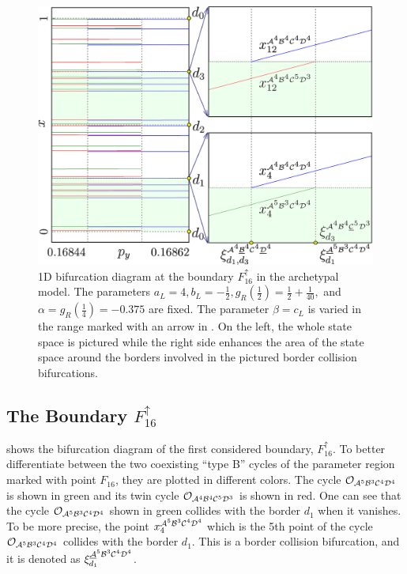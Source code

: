 \begin{figure}
	\centering
	\includegraphics[width=.7 \textwidth]{../Figures/6/6.6/result.png}
	\caption[1D bifurcation diagram at the boundary $F_{16}^\uparrow$ in the archetypal model]{
		1D bifurcation diagram at the boundary $F_{16}^\uparrow$ in the archetypal model.
		The parameters $a_L = 4, b_L = -\frac{1}{2}, g_R\left(\frac{1}{2}\right) = \frac{1}{2} + \frac{1}{40},$ and $\alpha = g_R\left(\frac{1}{4}\right) = -0.375$ are fixed.
		The parameter $\beta = c_L$ is varied in the range marked with an arrow in .
		On the left, the whole state space is pictured while the right side enhances the area of the state space around the borders involved in the pictured border collision bifurcations.
	}
	\label{fig:arch.bif.F.up}
\end{figure}

\clearpage
\subsection{The Boundary $F_{16}^\uparrow$}
\label{sec:arch.bif.U}

 shows the bifurcation diagram of the first considered boundary, $F_{16}^\uparrow$.
To better differentiate between the two coexisting ``type B'' cycles of the parameter region marked with point $F_{16}$, they are plotted in different colors.
The cycle $\mathcal{O}_{\mathcal{A}^5\mathcal{B}^3\mathcal{C}^4\mathcal{D}^4}$ is shown in green and its twin cycle $\mathcal{O}_{\mathcal{A}^4\mathcal{B}^4\mathcal{C}^5\mathcal{D}^3}$ is shown in  red.
One can see that the cycle $\mathcal{O}_{\mathcal{A}^5\mathcal{B}^3\mathcal{C}^4\mathcal{D}^4}$ shown in green collides with the border $d_1$ when it vanishes.
To be more precise, the point $x_4^{\mathcal{A}^5\mathcal{B}^3\mathcal{C}^4\mathcal{D}^4}$ which is the 5th point of the cycle $\mathcal{O}_{\mathcal{A}^5\mathcal{B}^3\mathcal{C}^4\mathcal{D}^4}$ collides with the border $d_1$.
This is a border collision bifurcation, and it is denoted as $\xi_{d_1}^{\underline{\mathcal{A}}^5\mathcal{B}^3\mathcal{C}^4\mathcal{D}^4}$.

